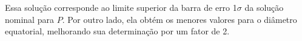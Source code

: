 \documentclass[12pt,a4paper]{monografia}
\begin{document}
Essa solução corresponde ao limite superior da barra de erro 1$\sigma$ da solução nominal para $P$. Por outro lado, ela obtém os menores valores para o diâmetro equatorial, melhorando sua determinação por um fator de 2.

\begin{figure}[h]
\begin{centering}

\end{centering}
\end{figure}
\end{document}
